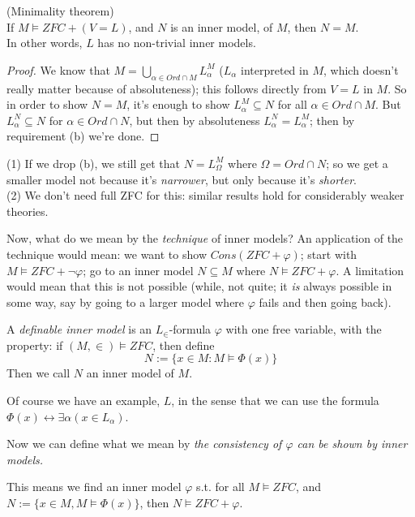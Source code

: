 \documentclass[a4paper]{article}
\begin{document}
\begin{thm} (Minimality theorem)\\
If $M \vDash ZFC+(V=L)$, and $N$ is an inner model, of $M$, then $N=M$.\\
In other words, $L$ has no non-trivial inner models.
\begin{proof}
We know that $M=\bigcup_{\alpha \in Ord \cap M} L_\alpha^M$ ($L_\alpha$ interpreted in $M$, which doesn't really matter because of absoluteness); this follows directly from $V=L$ in $M$. So in order to show $N=M$, it's enough to show $L_\alpha^M \subseteq N$ for all $\alpha \in Ord \cap M$. But $L_\alpha^N \subseteq N$ for $\alpha \in Ord \cap N$, but then by absoluteness $L_\alpha^N = L_\alpha^M$; then by requirement (b) we're done.
\end{proof}
\end{thm}

\begin{rem}
(1) If we drop (b), we still get that $N=L_\Omega^M$ where $\Omega = Ord \cap N$; so we get a smaller model not because it's \emph{narrower}, but only because it's \emph{shorter}.\\
(2) We don't need full ZFC for this: similar results hold for considerably weaker theories.
\end{rem}

Now, what do we mean by the \emph{technique} of inner models? An application of the technique would mean: we want to show $Cons(ZFC+\varphi)$; start with $M \vDash ZFC+\neg \varphi$; go to an inner model $N \subseteq M$ where $N \vDash ZFC+\varphi$. A limitation would mean that this is not possible (while, not quite; it \emph{is} always possible in some way, say by going to a larger model where $\varphi$ fails and then going back).

\begin{defi}
A \emph{definable inner model} is an $L_\in$-formula $\varphi$ with one free variable, with the property: if $(M,\in) \vDash ZFC$, then define
\[
N:= \{ x \in M: M \vDash \Phi(x)\}
\]
Then we call $N$ an inner model of $M$.
\end{defi}

Of course we have an example, $L$, in the sense that we can use the formula $\Phi(x) \leftrightarrow \exists \alpha (x \in L_\alpha)$.

Now we can define what we mean by \emph{the consistency of $\varphi$ can be shown by inner models.}

This means we find an inner model $\varphi$ s.t. for all $M \vDash ZFC$, and $N := \{x \in M, M \vDash \Phi(x)\}$, then $N \vDash ZFC+\varphi$.
\end{document}

